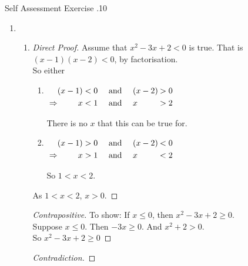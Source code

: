 \documentclass[\main/notes.tex]{subfiles}
\begin{document}
				\begin{exercise}{Self Assessment Exercise \thechapter.10}
					\begin{enumerate}
						\item {}
							\begin{enumerate}[label=(\alph*)]
								\item {}
									\begin{proof}[Direct Proof]
										Assume that $x^{2} - 3x + 2 < 0$ is true. That is $(x - 1)(x - 2) < 0$, by factorisation.\\
										So either
										\begin{enumerate}[label=(\roman*)]
											\item 
												$ \begin{alignedat}[t]{3}
													& & (x - 1) &< 0 \quad \text{ and } \quad (x - 2) \: &> 0\\
													& \Rightarrow & x &< 1 \quad \text{ and } \quad x &> 2 
												\end{alignedat} $
												\begin{indentparagraph}
													There is no $x$ that this can be true for.
												\end{indentparagraph}
											\item 
												$ \begin{alignedat}[t]{3}
													& & (x - 1) &> 0 \quad \text{ and } \quad (x - 2) \: &< 0\\
													& \Rightarrow & x &> 1 \quad \text{ and } \quad x &< 2 
												\end{alignedat} $
												\begin{indentparagraph}
													So $1 < x < 2$.
												\end{indentparagraph}
										\end{enumerate}
										As $1 < x < 2$, $x > 0$.
									\end{proof}
									\begin{proof}[Contrapositive]
										To show: If $x \leq 0$, then $x^{2} - 3x + 2 \geq 0$.\\
										Suppose $x \leq 0$. Then $-3x \geq 0$. And $x^{2} + 2 > 0$.\\
										So $x^{2} - 3x + 2 \geq 0$
									\end{proof}
									\begin{proof}[Contradiction]

\end{proof}
\end{enumerate}
\end{enumerate}
\end{exercise}
\end{document}
